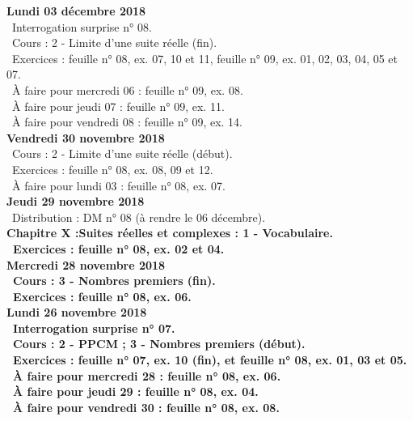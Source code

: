\documentclass[12pt,a4paper]{article}
\begin{document}
\noindent\textbf{Lundi 03 décembre 2018}\\
\bu\ Interrogation surprise n° 08.\\
\bu\ Cours : 2 - Limite d'une suite réelle (fin).\\
\bu\ Exercices : feuille n° 08, ex. 07, 10 et 11, feuille n° 09, ex. 01, 02, 03, 04, 05 et 07.\\
\bu\ À faire pour mercredi 06 : feuille n° 09, ex. 08.\\
\bu\ À faire pour jeudi 07 : feuille n° 09, ex. 11.\\
\bu\ À faire pour vendredi 08 : feuille n° 09, ex. 14.\vspace{.4cm}\\
 
\noindent\textbf{Vendredi 30 novembre 2018}\\
\bu\ Cours : 2 - Limite d'une suite réelle (début).\\
\bu\ Exercices : feuille n° 08, ex. 08, 09 et 12.\\
\bu\ À faire pour lundi 03 : feuille n° 08, ex. 07.\vspace{.4cm}\\
 
\noindent\textbf{Jeudi 29 novembre 2018}\\
\bu\ Distribution : DM n° 08 (à rendre le 06 décembre).\\
\bf Chapitre X :\rm Suites réelles et complexes : 1 - Vocabulaire.\\
\bu\ Exercices : feuille n° 08, ex. 02 et 04.\vspace{.4cm}\\
 
\noindent\textbf{\bf Mercredi 28 novembre 2018}\\
\bu\ Cours : 3 - Nombres premiers (fin).\\
\bu\ Exercices : feuille n° 08, ex. 06.\vspace{.4cm}\\
 
\noindent\textbf{Lundi 26 novembre 2018}\\
\bu\ Interrogation surprise n° 07.\\
\bu\ Cours : 2 - PPCM ; 3 - Nombres premiers (début).\\
\bu\ Exercices : feuille n° 07, ex. 10 (fin), et feuille n° 08, ex. 01, 03 et 05.\\
\bu\ À faire pour mercredi 28 : feuille n° 08, ex. 06.\\
\bu\ À faire pour jeudi 29 : feuille n° 08, ex. 04.\\
\bu\ À faire pour vendredi 30 : feuille n° 08, ex. 08.\vspace{.4cm}\\
 
\end{document}

